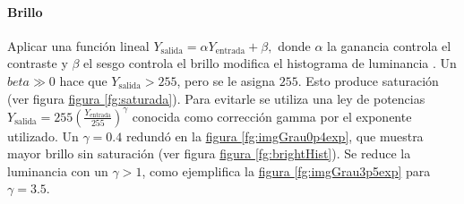 \documentclass{article}
\begin{document}
\paragraph{Brillo}
Aplicar una función lineal 
$
Y_\mathrm{salida} = \alpha Y_\mathrm{entrada} + \beta ,
$
donde $\alpha$ la ganancia controla el contraste y $\beta$ el sesgo controla el brillo modifica el histograma de luminancia \cite{noauthor_opencv_nodate}.
Un \(beta \gg 0\) hace que \(Y_\mathrm{salida}> 255\), pero se le asigna \(255\).
Esto produce saturación (ver figura \hyperref[fg:saturada]{figura \ref*{fg:saturada}}).
Para evitarle se utiliza una ley de potencias
\(
Y_\mathrm{salida} = 255 \left( \frac{Y_\mathrm{entrada}}{255} \right)^\gamma  
\)
conocida como corrección gamma por el exponente utilizado.
Un \(\gamma= 0.4\) redundó en la \hyperref[fg:imgGrau0p4exp]{figura \ref*{fg:imgGrau0p4exp}}, que muestra mayor brillo sin saturación (ver figura \hyperref[fg:brightHist]{figura \ref*{fg:brightHist}}).
Se reduce la luminancia con un \(\gamma >1\), como ejemplifica la \hyperref[fg:imgGrau3p5exp]{figura \ref*{fg:imgGrau3p5exp}} para \(\gamma = 3.5\).
\end{document}
